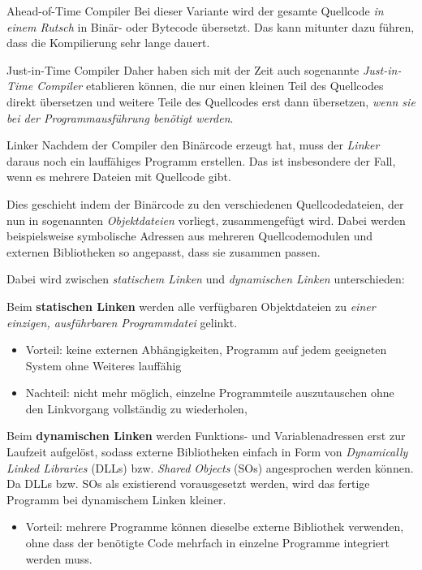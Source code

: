 \documentclass[german]{spicker}
\begin{document}
\begin{bonus}{Ahead-of-Time Compiler}
    Bei dieser Variante wird der gesamte Quellcode \emph{in einem Rutsch}
    in Binär- oder Bytecode übersetzt. Das kann mitunter dazu führen, dass die Kompilierung
    sehr lange dauert.
\end{bonus}

\begin{bonus}{Just-in-Time Compiler}
    Daher haben sich mit der Zeit auch sogenannte \emph{Just-in-
        Time Compiler} etablieren können, die nur einen kleinen Teil des Quellcodes direkt
    übersetzen und weitere Teile des Quellcodes erst dann übersetzen, \emph{wenn sie bei der
        Programmausführung benötigt werden}.
\end{bonus}

\begin{defi}{Linker}
    Nachdem der Compiler den Binärcode erzeugt hat, muss der \emph{Linker} daraus noch
    ein lauffähiges Programm erstellen. Das ist insbesondere der Fall, wenn es mehrere
    Dateien mit Quellcode gibt.

    Dies geschieht indem der Binärcode zu den verschiedenen
    Quellcodedateien, der nun in sogenannten \emph{Objektdateien} vorliegt, zusammengefügt wird. Dabei werden beispielsweise symbolische Adressen aus mehreren
    Quellcodemodulen und externen Bibliotheken so angepasst, dass sie zusammen
    passen.

    Dabei wird zwischen \emph{statischem Linken} und \emph{dynamischen Linken} unterschieden:

    Beim \textbf{statischen Linken} werden alle verfügbaren Objektdateien zu \emph{einer
        einzigen, ausführbaren Programmdatei} gelinkt.
    \begin{itemize}
        \item Vorteil: keine externen Abhängigkeiten, Programm auf jedem geeigneten System ohne Weiteres lauffähig
        \item Nachteil: nicht mehr möglich, einzelne Programmteile auszutauschen ohne den Linkvorgang vollständig zu wiederholen,
    \end{itemize}
    Beim \textbf{dynamischen Linken} werden Funktions- und Variablenadressen erst zur Laufzeit aufgelöst, sodass externe Bibliotheken
    einfach in Form von \emph{Dynamically Linked Libraries} (DLLs) bzw. \emph{Shared Objects} (SOs) angesprochen werden können. Da DLLs bzw. SOs als existierend
    vorausgesetzt werden, wird das fertige Programm bei dynamischem Linken kleiner.
    \begin{itemize}
        \item Vorteil: mehrere Programme können dieselbe externe Bibliothek verwenden, ohne dass der benötigte Code mehrfach in einzelne Programme integriert werden muss.
    \end{itemize}
\end{defi}
\end{document}
